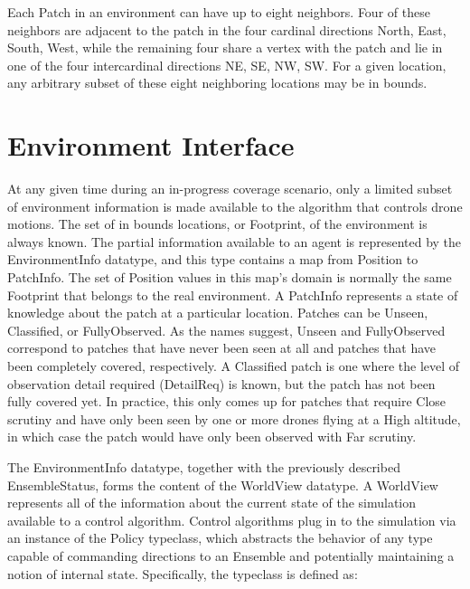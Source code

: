
Each Patch in an environment can have up to eight neighbors. Four of these neighbors are adjacent to the patch in the four cardinal directions {North, East, South, West}, while the remaining four share a vertex with the patch and lie in one of the four intercardinal directions {NE, SE, NW, SW}. For a given location, any arbitrary subset of these eight neighboring locations may be in bounds.


\section{Environment Interface}

At any given time during an in-progress coverage scenario, only a limited subset of environment information is made available to the algorithm that controls drone motions. The set of in bounds locations, or Footprint, of the environment is always known. The partial information available to an agent is represented by the EnvironmentInfo datatype, and this type contains a map from Position to PatchInfo. The set of Position values in this map's domain is normally the same Footprint that belongs to the real environment. A PatchInfo represents a state of knowledge about the patch at a particular location. Patches can be Unseen, Classified, or FullyObserved. As the names suggest, Unseen and FullyObserved correspond to patches that have never been seen at all and patches that have been completely covered, respectively. A Classified patch is one where the level of observation detail required (DetailReq) is known, but the patch has not been fully covered yet. In practice, this only comes up for patches that require Close scrutiny and have only been seen by one or more drones flying at a High altitude, in which case the patch would have only been observed with Far scrutiny.

The EnvironmentInfo datatype, together with the previously described EnsembleStatus, forms the content of the WorldView datatype. A WorldView represents all of the information about the current state of the simulation available to a control algorithm. Control algorithms plug in to the simulation via an instance of the Policy typeclass, which abstracts the behavior of any type capable of commanding directions to an Ensemble and potentially maintaining a notion of internal state. Specifically, the typeclass is defined as:

